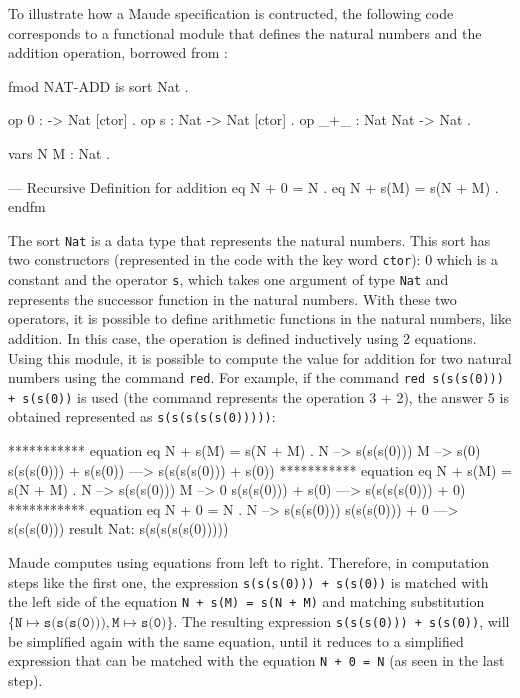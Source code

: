 To illustrate how a Maude specification is contructed, the following code corresponds to a functional module that defines the natural numbers and the addition operation, borrowed from \cite{PeterMaude,Lecture1}: 
\\
\begin{maude}
fmod NAT-ADD is
  sort Nat .

  op 0 : -> Nat [ctor] .
  op s : Nat -> Nat [ctor] .
  op _+_ : Nat Nat -> Nat .

  vars N M : Nat .
    
  --- Recursive Definition for addition
  eq N + 0 = N .
  eq N + s(M) = s(N + M) .
endfm
\end{maude}
The sort \texttt{Nat} is a data type that represents the natural numbers. This sort has two constructors (represented in the code with the key word \texttt{ctor}): 0 which is a constant and the operator \texttt{s}, which takes one argument of type \texttt{Nat} and represents the successor function in the natural numbers. With these two operators, it is possible to define arithmetic functions in the natural numbers, like addition. In this case, the operation is defined inductively using 2 equations. Using this module, it is possible to compute the value for addition for two natural numbers using the command \texttt{red}. For example, if the command \texttt{red s(s(s(0))) + s(s(0))} is used (the command represents the operation 3 + 2), the answer 5 is obtained represented as \texttt{s(s(s(s(s(0)))))}:
\\
\begin{maude2}
*********** equation
eq N + s(M) = s(N + M) .
N --> s(s(s(0)))
M --> s(0)
s(s(s(0))) + s(s(0))
--->
s(s(s(s(0))) + s(0))
*********** equation
eq N + s(M) = s(N + M) .
N --> s(s(s(0)))
M --> 0
s(s(s(0))) + s(0)
--->
s(s(s(s(0))) + 0)
*********** equation
eq N + 0 = N .
N --> s(s(s(0)))
s(s(s(0))) + 0
--->
s(s(s(0)))
result Nat: s(s(s(s(s(0)))))
\end{maude2}
Maude computes using equations from left to right. Therefore, in computation steps like the first one, the expression \texttt{s(s(s(0))) + s(s(0))} is matched with the left side of the equation \texttt{N + s(M) = s(N + M)} and matching substitution $\{\texttt{N} \mapsto \texttt{s(s(s(0)))},\texttt{M} \mapsto \texttt{s(0)} \}$. The resulting expression \texttt{s(s(s(0))) + s(s(0))}, will be simplified again with the same equation, until it reduces to a simplified expression that can be matched with the equation \texttt{N + 0 = N} (as seen in the last step).

